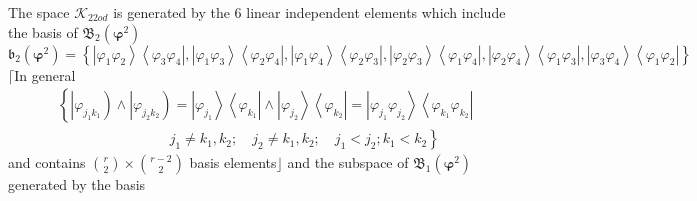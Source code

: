 \documentclass[aps,preprint]{revtex4}%
\begin{document}
The space $\mathcal{K}_{22od}$ is generated by the $6$ linear independent
elements which include the basis of $\mathfrak{B}_{2}\left(  \mathbf{\varphi
}^{2}\right)  $
\begin{equation}
\mathfrak{b}_{2}\left(  \mathbf{\varphi}^{2}\right)  =\left\{  \left\vert
\varphi_{1}\varphi_{2}\right\rangle \left\langle \varphi_{3}\varphi
_{4}\right\vert ,\left\vert \varphi_{1}\varphi_{3}\right\rangle \left\langle
\varphi_{2}\varphi_{4}\right\vert ,\left\vert \varphi_{1}\varphi
_{4}\right\rangle \left\langle \varphi_{2}\varphi_{3}\right\vert ,\left\vert
\varphi_{2}\varphi_{3}\right\rangle \left\langle \varphi_{1}\varphi
_{4}\right\vert ,\left\vert \varphi_{2}\varphi_{4}\right\rangle \left\langle
\varphi_{1}\varphi_{3}\right\vert ,\left\vert \varphi_{3}\varphi
_{4}\right\rangle \left\langle \varphi_{1}\varphi_{2}\right\vert \right\}
\end{equation}
$\lceil$In general
\begin{align}
&  \left\{  \left\vert \varphi_{j_{1}k_{1}}\right)  \wedge\left\vert
\varphi_{j_{2}k_{2}}\right)  =\left\vert \varphi_{j_{1}}\right\rangle
\left\langle \varphi_{k_{1}}\right\vert \wedge\left\vert \varphi_{j_{2}%
}\right\rangle \left\langle \varphi_{k_{2}}\right\vert =\left\vert
\varphi_{j_{1}}\varphi_{j_{2}}\right\rangle \left\langle \varphi_{k_{1}%
}\varphi_{k_{2}}\right\vert \right. \nonumber\\
&  \qquad\qquad\qquad\qquad\left.  j_{1}\neq k_{1},k_{2};\quad j_{2}\neq
k_{1},k_{2};\quad j_{1}<j_{2};k_{1}<k_{2}\right\}
\end{align}
and contains $\binom{r}{2}\times\binom{r-2}{2}$ basis elements$\rfloor$ and
the subspace of $\mathfrak{B}_{1}\left(  \mathbf{\varphi}^{2}\right)  $
generated by the basis
\end{document}
